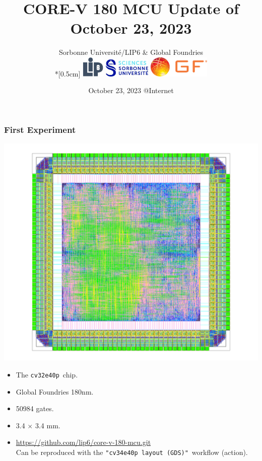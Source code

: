 \documentclass[10pt,aspectratio=169,presentation]{beamer}
\title{CORE-V 180 MCU Update of October 23, 2023}
\author[J.-P. \Chaput]{Sorbonne Université/LIP6 \& Global Foundries \\*[0.5cm]
                          \includegraphics[height=1.0cm]{./images/Logo-LIP6-bleugris}\hspace{0.5cm}
                          \includegraphics[height=0.9cm]{./images/Logo-SU}           \hspace{0.5cm}
                          \includegraphics[height=1.0cm]{./images/GFonly-ORANGE-letters}%
                         }
\institute[SU-LIP6]{ \texttt{Jean-Paul.Chaput@lip6.fr} }
\date[October 23, 2023]{October 23, 2023 @Internet}
\begin{document}
   \titlepage


  \begin{frame}
    \frametitle{First Experiment}
     \begin{minipage}[c]{.48\textwidth}
       \includegraphics[height=.80\textheight]{images/chip_cv32e40p_white.png}
     \end{minipage}
     \begin{minipage}[c]{.5\textwidth}
       \begin{itemize}
         \item The \texttt{cv32e40p}\ chip.
         \item Global Foundries 180nm.
         \item 50984 gates.
         \item 3.4 $\times$ 3.4 mm.
         \item {\footnotesize\url{https://github.com/lip6/core-v-180-mcu.git}} \\
               Can be reproduced with the \texttt{"cv34e40p~layout~(GDS)"}\ workflow (action).
       \end{itemize}
     \end{minipage}
  \end{frame}
\end{document}
